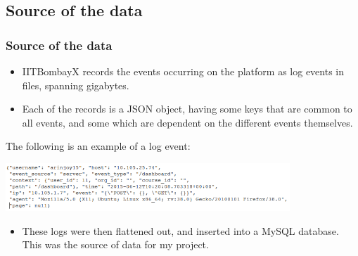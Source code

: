 \documentclass[12pt,xcolor=dvipsnames]{beamer}
\begin{document}
\subsection{Source of the data}

\begin{frame}[t]
\frametitle{Source of the data}

\begin{itemize}

\item IITBombayX records the events occurring on the platform as log events in files, spanning gigabytes.

\item Each of the records is a JSON object, having some keys that are common to all events, and some which are dependent on the different events themselves.

\end{itemize}

The following is an example of a log event:

\begin{center}
\includegraphics[height=1.8cm]{Diag1.png}\\ %
\end{center}

\begin{itemize}
\item These logs were then flattened out, and inserted into a MySQL database. This was the source of data for my project.
\end{itemize}

\end{frame}

\end{document}
